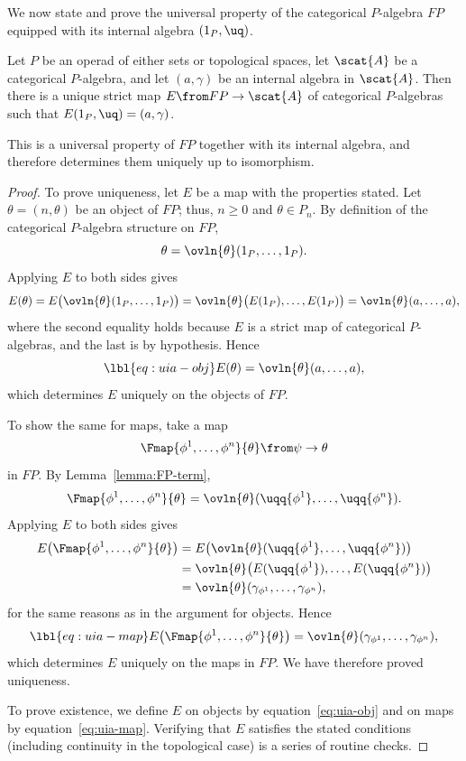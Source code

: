 We now state and prove the universal%
%
% 
property of the categorical $P$-algebra $FP$ equipped with its internal
algebra $(1_P, \uq)$.

\begin{thm}
Let $P$ be an operad of either sets or topological spaces, let $\scat{A}$
be a categorical $P$-algebra, and let $(a, \gamma)$ be an internal algebra
in $\scat{A}$.  Then there is a unique strict map $E \from FP \to \scat{A}$
of categorical $P$-algebras such that $E(1_P, \uq) = (a, \gamma)$.
\end{thm}

This is a universal property of $FP$ together with its internal algebra,
and therefore determines them uniquely up to isomorphism.

\begin{proof}
To prove uniqueness, let $E$ be a map with the properties stated.  Let
$\theta = (n, \theta)$ be an object of $FP$; thus, $n \geq 0$ and $\theta
\in P_n$.  By definition of the categorical $P$-algebra structure on $FP$,
\[
\theta
= 
\ovln{\theta}(1_P, \ldots, 1_P).
\]
Applying $E$ to both sides gives
\[
E(\theta)
=
E\bigl(\ovln{\theta}(1_P, \ldots, 1_P)\bigr)
=
\ovln{\theta}\bigl(E(1_P), \ldots, E(1_P)\bigr)
=
\ovln{\theta}(a, \ldots, a),
\]
where the second equality holds because $E$ is a strict map of categorical
$P$-algebras, and the last is by hypothesis.  Hence
% 
\begin{equation}
\lbl{eq:uia-obj}
E(\theta) = \ovln{\theta}(a, \ldots, a),
\end{equation}
% 
which determines $E$ uniquely on the objects of $FP$.

To show the same for maps, take a map 
\[
\Fmap{\phi^1, \ldots, \phi^n}{\theta} \from \psi \to \theta
\]
in $FP$.  By Lemma~\ref{lemma:FP-term}, 
\[
\Fmap{\phi^1, \ldots, \phi^n}{\theta}
=
\ovln{\theta}(\uqq{\phi^1}, \ldots, \uqq{\phi^n}).
\]
Applying $E$ to both sides gives
% 
\begin{align*}
E\bigl( \Fmap{\phi^1, \ldots, \phi^n}{\theta} \bigr)    &
=
E\bigl( \ovln{\theta}(\uqq{\phi^1}, \ldots, \uqq{\phi^n}) \bigr)    \\
&
=
\ovln{\theta}\bigl(
E(\uqq{\phi^1}), \ldots, E(\uqq{\phi^n})
\bigr)  \\
&
=
\ovln{\theta}(\gamma_{\phi^1}, \ldots, \gamma_{\phi^n}),
\end{align*}
% 
for the same reasons as in the argument for objects.  Hence
% 
\begin{equation}
\lbl{eq:uia-map}
E\bigl( \Fmap{\phi^1, \ldots, \phi^n}{\theta} \bigr)    
=
\ovln{\theta}(\gamma_{\phi^1}, \ldots, \gamma_{\phi^n}),
\end{equation}
% 
which determines $E$ uniquely on the maps in $FP$.  We have therefore
proved uniqueness.

To prove existence, we define $E$ on objects by equation~\eqref{eq:uia-obj}
and on maps by equation~\eqref{eq:uia-map}.  Verifying that $E$ satisfies
the stated conditions (including continuity in the topological case) is a
series of routine checks. 
\end{proof}

